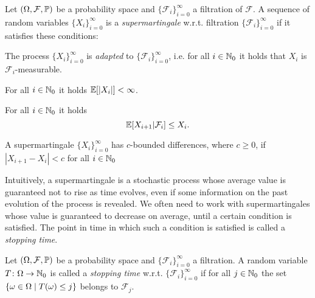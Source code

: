 
\smallskip
\begin{definition}[Supermartingale]
Let $(\Omega,\mathcal{F},\mathbb{P})$ be a probability space and 
$\{\mathcal{F}_i\}_{i=0}^{\infty}$ a filtration of $\mathcal{F}$. A sequence of 
random variables $\{X_i\}_{i=0}^{\infty}$ is a \emph{supermartingale} w.r.t. 
filtration $\{\mathcal{F}_i\}_{i=0}^{\infty}$ if it satisfies these conditions:
\begin{compactenum}
\item  The process $\{X_i\}_{i=0}^{\infty}$ is \emph{adapted} to 
$\{\mathcal{F}_i\}_{i=0}^{\infty}$, i.e. for all $i\in \mathbb{N}_0$ it holds that 
$X_i$ is $\mathcal{F}_i$-measurable.
\item For all $i\in \mathbb{N}_0$ it holds $\mathbb{E}[|X_i|]<\infty$.
\item For all $i\in \mathbb{N}_0$ it holds 
\begin{equation}
\label{eq:supermart-def}
\mathbb{E}[X_{i+1}|\mathcal{F}_i] \leq X_i.
\end{equation}

A supermartingale $\{X_i\}_{i=0}^{\infty}$ has $c$-bounded differences, where 
$c\geq 0$, if $|X_{i+1}-X_i|<c$ for all $i\in \mathbb{N}_0$
\end{compactenum}
\end{definition}


Intuitively, a supermartingale is a stochastic process whose average value is 
guaranteed not to rise as time evolves, even if some information on the past 
evolution of the process is revealed. 
We often need to work with supermartingales whose value 
is guaranteed to decrease on average, until a certain condition is 
satisfied. The point in time in which such a condition is satisfied is called a 
\emph{stopping time}.

\smallskip
\begin{definition}
Let $(\Omega,\mathcal{F},\mathbb{P})$ be a probability space and 
$\{\mathcal{F}_i\}_{i=0}^{\infty}$ a filtration. A random variable $T 
\colon 
\Omega\rightarrow \mathbb{N}_0$ is called a \emph{stopping time} w.r.t. 
$\{\mathcal{F}_i\}_{i=0}^{\infty}$ if %
for all $j\in \mathbb{N}_0$ the set $\{\omega\in \Omega\mid T(\omega)\leq j\}$ 
belongs to $\mathcal{F}_j$.
\end{definition}



